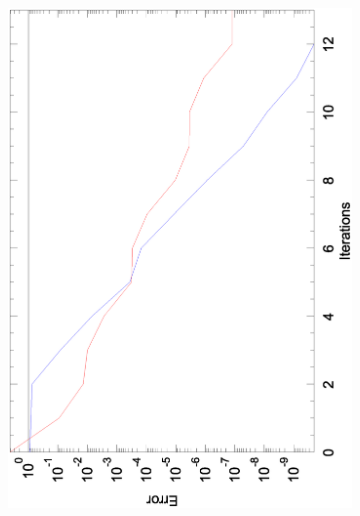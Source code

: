 \documentclass[12pt,parskip=full]{article}
\numberwithin{subsection}{section}
\begin{document}
		\begin{figure}[h]
			\centering
			\begin{subfigure}[h]{0.45\textwidth}
				\includegraphics[width=\textwidth, angle=270]{Convergance_1_40.eps}
				\vspace{-13ex}
			\end{subfigure}
			\begin{subfigure}[h]{0.45\textwidth}

\end{subfigure}
\end{figure}
\end{document}
